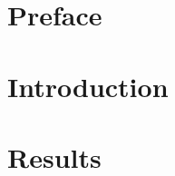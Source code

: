 \documentclass[11pt]{report}
\begin{document}
	
	\chapter*{Preface}
	\lipsum[1-1]
	\tableofcontents\label{toc}
	\chapter{Introduction}
	\lipsum[2-2]
	
	\chapter{Results}
	\lipsum[2-4]
\end{document}
